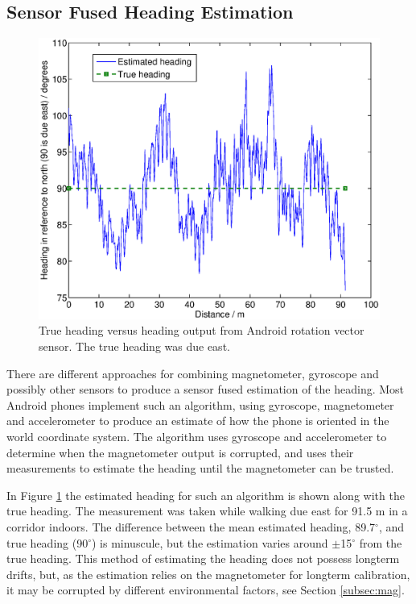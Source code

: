\documentclass{LTHthesis}
\begin{document}
\subsection{Sensor Fused Heading Estimation}
%
\begin{figure}[!hbt]

\includegraphics[width=1\textwidth ]{images/kinematic/rot_test}
\caption{True heading versus heading output from Android rotation vector sensor. The true heading was due east.}\label{rot_test}
\end{figure}
%
There are different approaches for combining magnetometer, gyroscope and possibly other sensors to produce a sensor fused estimation of the heading. Most Android phones implement such an algorithm, using gyroscope, magnetometer and accelerometer to produce an estimate of how the phone is oriented in the world coordinate system. The algorithm uses gyroscope and accelerometer to determine when the magnetometer output is corrupted, and uses their measurements to estimate the heading until the magnetometer can be trusted. 

In Figure \ref{rot_test} the estimated heading for such an algorithm is shown along with the true heading. The measurement was taken while walking due east for 91.5 m in a corridor indoors. The difference between the mean estimated heading, 89.7$^\circ$, and true heading (90$^\circ$) is minuscule, but the estimation varies around $\pm$15$^\circ$ from the true heading. This method of estimating the heading does not possess longterm drifts, but, as the estimation relies on the magnetometer for longterm calibration, it may be corrupted by different environmental factors, see Section \ref{subsec:mag}. 
%
\end{document}
